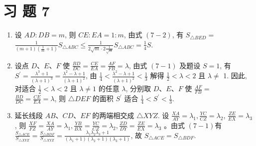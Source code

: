 \documentclass[10pt]{article}
\begin{document}
\section*{习 题 7}
\begin{enumerate}
  \item 设 $A D: D B=m$, 则 $C E: E A=1: m$, 由式 $(7-2)$, 有 $S_{\triangle B E D}=$ $\frac{1}{(m+1)\left(\frac{1}{m}+1\right)} S_{\triangle A B C} \leqslant \frac{1}{2 \sqrt{m} \cdot 2 \frac{1}{\sqrt{m}}} S_{\triangle A B C}=\frac{1}{4} S$.
  \item 设点 $D 、 E 、 F$ 使 $\frac{B D}{D C}=\frac{C E}{E A}=\frac{A F}{F B}=\lambda$, 由式 $(7-1)$ 及题设 $S=1$, 有 $S^{\prime}=\frac{\lambda^{3}+1}{(\lambda+1)^{3}}=\frac{\lambda^{2}-\lambda+1}{(\lambda+1)^{2}}$, 由 $\frac{1}{4}<\frac{\lambda^{2}-\lambda+1}{(\lambda+1)^{2}}<\frac{1}{3}$ 解得 $\frac{1}{2}<\lambda<2$ 且 $\lambda \neq$ 1. 因此, 对适合 $\frac{1}{2}<\lambda<2$ 且 $\lambda \neq 1$ 的任意 $\lambda$, 分别取 $D 、 E 、 F$ 使 $\frac{A F}{F B}=$\\
$\frac{B D}{D C}=\frac{C E}{E A}=\lambda$, 则 $\triangle D E F$ 的面积 $S^{\prime}$ 适合 $\frac{1}{4}<S^{\prime}<\frac{1}{3}$.
  \item 延长线段 $A B 、 C D 、 E F$ 的两端相交成 $\triangle X Y Z$. 设 $\frac{X A}{A Y}=\lambda_{1}, \frac{Y C}{C Z}=\lambda_{2}$, $\frac{Z E}{E X}=\lambda_{3}$, 则 $\frac{X F}{F Z}=\frac{X A}{A Y}=\lambda_{1}, \frac{Y B}{B X}=\frac{Y C}{C Z}=\lambda_{2}, \frac{Z D}{D Y}=\frac{Z E}{E X}=\lambda_{3}$ 。由式 $(7-1)$有 $\frac{S_{\triangle A C E}}{S_{\triangle X Y Z}}=\frac{S_{\triangle B D F}}{S_{\triangle X Y Z}}=\frac{\lambda_{1} \lambda_{2} \lambda_{3}+1}{\left(\lambda_{1}+1\right)\left(\lambda_{2}+1\right)\left(\lambda_{3}+1\right)}$, 故 $S_{\triangle A C E}=S_{\triangle B D F}$.
\end{enumerate}
\end{document}
